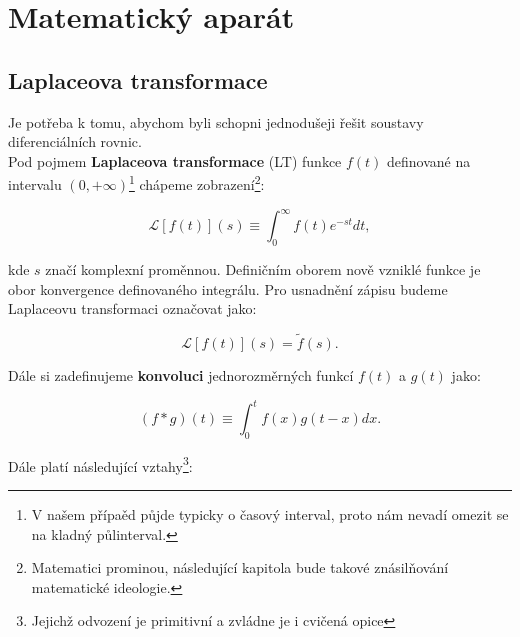 \section{Matematický aparát}

\subsection{Laplaceova transformace}

Je potřeba k tomu, abychom byli schopni jednodušeji řešit soustavy diferenciálních rovnic.\\

Pod pojmem \textbf{Laplaceova transformace} (LT) funkce $f(t)$ definované na intervalu $(0,+\infty)$\footnote{V našem přípaěd půjde typicky o časový interval, proto nám nevadí omezit se na kladný půlinterval.} chápeme zobrazení\footnote{Matematici prominou, následující kapitola bude takové znásilňování matematické ideologie.}:

\begin{equation}
  \mathcal{L}[f(t)](s) \equiv \int_0^\infty f(t) e^{-st} dt,
  \label{Laplaceovka}
\end{equation}

kde $s$ značí komplexní proměnnou. Definičním oborem nově vzniklé funkce je obor konvergence definovaného integrálu. Pro usnadnění zápisu budeme Laplaceovu transformaci označovat jako:

$$ \mathcal{L}[f(t)](s) = \tilde{f}(s). $$

Dále si zadefinujeme \textbf{konvoluci} jednorozměrných funkcí $f(t)$ a $g(t)$ jako:

\begin{equation}
  (f*g)(t) \equiv \int_0^t f(x) g(t-x) dx.
  \label{Konvoluce}
\end{equation}

Dále platí následující vztahy\footnote{Jejichž odvození je primitivní a zvládne je i cvičená opice}:

